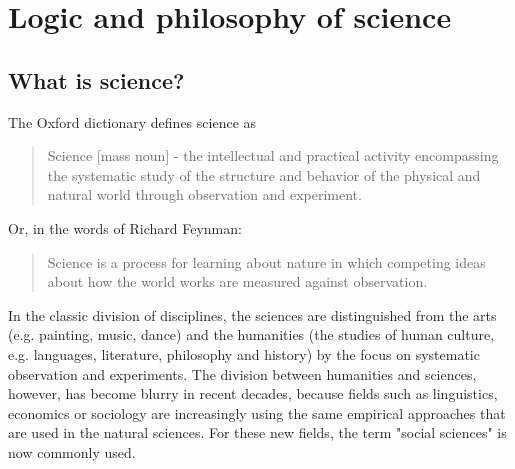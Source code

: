 \documentclass{tufte-book}
\begin{document}
\chapter{Logic and philosophy of science}

\section{What is science?}

The Oxford dictionary defines science as

\begin{quote}
Science [mass noun] - the intellectual and practical activity encompassing the systematic study of the structure and behavior of the physical and natural world through observation and experiment.
\end{quote}

\noindent Or, in the words of Richard Feynman:

\begin{quote}
Science is a process for learning about nature in which competing ideas about how the world works are measured against observation.
\end{quote}

In the classic division of disciplines, the sciences are distinguished from the arts (e.g. painting, music, dance) and the humanities (the studies of human culture, e.g. languages, literature, philosophy and history) by the focus on systematic observation and experiments. The division between humanities and sciences, however, has become blurry in recent decades, because fields such as linguistics, economics or sociology are increasingly using the same empirical approaches that are used in the natural sciences. For these new fields, the term "social sciences" is now commonly used. 
\end{document}

